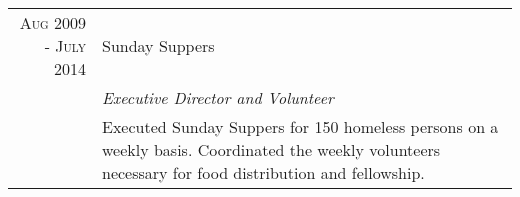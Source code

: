 \documentclass[a4paper,10pt]{article} %
\begin{document}
\begin{tabular}{r|p{11cm}}
\textsc{Aug 2009 - July 2014} & Sunday Suppers\\
& \emph{Executive Director and Volunteer} \\
& \footnotesize{Executed Sunday Suppers for 150 homeless persons on a weekly basis. Coordinated the weekly volunteers necessary for food distribution and fellowship.}
\end{tabular}



\nocite{*}

\end{document}
